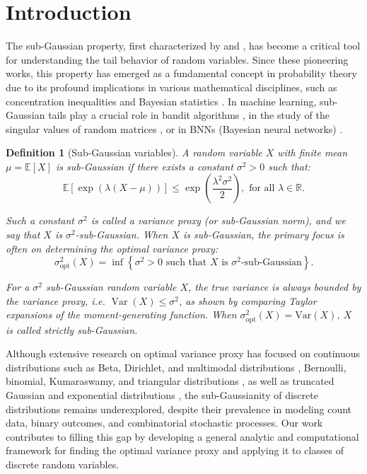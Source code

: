 \documentclass[a4paper, 10pt]{article}
\newtheorem{definition}{Definition}[section]
\theoremstyle{definition}
\begin{document}
\section{Introduction}\label{s:1}
The sub-Gaussian property, first characterized by \citet{Kahane1960PropritsLD} and \citet{buldygin1980sub}, has become a critical tool for understanding the tail behavior of random variables. Since these pioneering works, this property has emerged as a fundamental concept in probability theory due to its profound implications in various mathematical disciplines, such as concentration inequalities \citep{Hoeffding1963, boucheron2003concentration, raginsky2013concentration} and Bayesian statistics \citep{elder2016bayesian, catoni2007pac}. In machine learning, sub-Gaussian tails play a crucial role in bandit algorithms \citep{bubeck2012regret}, in the study of the singular values of random matrices \citep{rudelson2010non}, or in BNNs (Bayesian neural networks) \citep{vladimirova2019understanding, vladimirova2020sub}.

\begin{definition}[Sub-Gaussian variables] A random variable \( X \) with finite mean \( \mu = \mathbb{E}[X] \) is \textit{sub-Gaussian} if there exists a constant \( \sigma^2 > 0 \) such that:
\begin{equation}
    \mathbb{E}[\exp(\lambda (X - \mu))] \leq \exp\left(\frac{\lambda^2 \sigma^2}{2}\right), \text{ for all } \lambda \in \mathbb{R}.
    \label{eq:def_sub}
\end{equation}

Such a constant \( \sigma^2 \) is called a \textit{variance proxy} (or \textit{sub-Gaussian norm}), and we say that \( X \) is \(\sigma^2\)-sub-Gaussian. When \( X \) is sub-Gaussian, the primary focus is often on determining the \textit{optimal variance proxy}:
\[
\sigma^2_{\mathrm{opt}}(X) = \inf \left\{ \sigma^2 > 0 \text{ such that } X \text{ is } \sigma^2\text{-sub-Gaussian} \right\}.
\]

For a \(\sigma^2\) sub-Gaussian random variable \(X\), the true variance is always bounded by the variance proxy, i.e. $\operatorname{Var}(X) \leq \sigma^2$, as shown by comparing Taylor expansions of the moment-generating function. When $\sigma^2_{\mathrm{opt}}(X) = \mathrm{Var}(X)$, \(X\) is called \textit{strictly} sub-Gaussian.
\end{definition}

Although extensive research on optimal variance proxy has focused on continuous distributions such as Beta, Dirichlet, and multimodal distributions \citep{marchal2017sub}, Bernoulli, binomial, Kumaraswamy, and triangular distributions \citep{arbel2020strict}, as well as truncated Gaussian and exponential distributions \citep{barreto2024optimal}, the sub-Gaussianity of discrete distributions remains underexplored, despite their prevalence in modeling count data, binary outcomes, and combinatorial stochastic processes. Our work contributes to filling this gap by developing a general analytic and computational framework for finding the optimal variance proxy and applying it to classes of discrete random variables.
\end{document}
